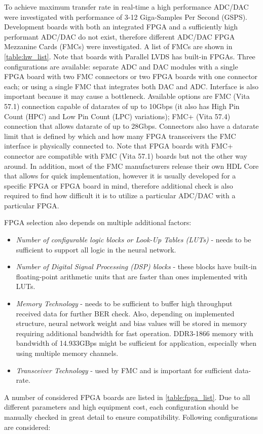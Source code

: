     To achieve maximum transfer rate in real-time a high performance ADC/DAC were investigated with performance of 3-12 Giga-Samples Per Second (GSPS). Development boards with both an integrated FPGA and a sufficiently high performant ADC/DAC do not exist, therefore different ADC/DAC FPGA Mezzanine Cards (FMCs) were investigated. A list of FMCs are shown in \autoref{table:hw_list}. Note that boards with Parallel LVDS has built-in FPGAs.  Three configurations are available: separate ADC and DAC modules with a single FPGA board with two FMC connectors or two FPGA boards with one connector each; or using a single FMC that integrates both DAC and ADC. Interface is also important because it may cause a bottleneck. Available options are FMC (Vita 57.1) connection capable of datarates of up to 10Gbps (it also has High Pin Count (HPC) and Low Pin Count (LPC) variations); FMC+ (Vita 57.4) connection that allows datarate of up to 28Gbps. Connectors also have a datarate limit that is defined by which and how many FPGA transceivers the FMC interface is physically connected to. Note that FPGA boards with FMC+ connector are compatible with FMC (Vita 57.1) boards but not the other way around. In addition, most of the FMC manufacturers release their own HDL Core that allows for quick implementation, however it is usually developed for a specific FPGA or FPGA board in mind, therefore additional check is also required to find how difficult it is to utilize a particular ADC/DAC with a particular FPGA. 
    
    FPGA selection also depends on multiple additional factors:
    \begin{itemize}
        \item \textit{Number of configurable logic blocks or Look-Up Tables (LUTs)} - needs to be sufficient to support all logic in the neural network.
        \item \textit{Number of Digital Signal Processing (DSP) blocks} - these blocks have built-in floating-point arithmetic units that are faster than ones implemented with LUTs. 
        \item \textit{Memory Technology} - needs to be sufficient to buffer high throughput received data for further BER check. Also, depending on implemented structure, neural network weight and bias values will be stored in memory requiring additional bandwidth for fast operation. DDR3-1866 memory with bandwidth of 14.933GBps might be sufficient for application, especially when using multiple memory channels.
        \item \textit{Transceiver Technology} - used by FMC and is important for sufficient data-rate.
    \end{itemize}
    A number of considered FPGA boards are listed in \autoref{table:fpga_list}. Due to all different parameters and high equipment cost, each configuration should be manually checked in great detail to ensure compatibility. Following configurations are considered:
    
